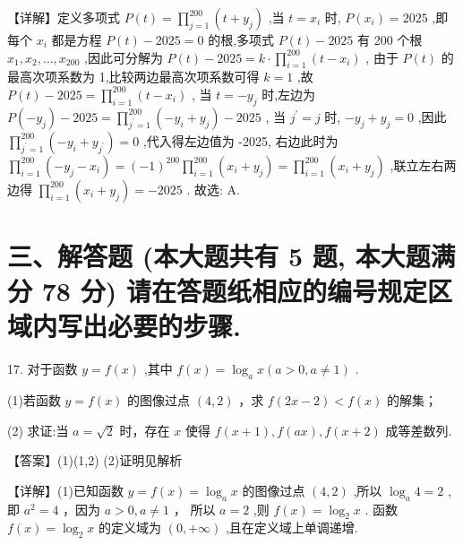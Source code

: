 \documentclass[10pt]{article}
\begin{document}
【详解】定义多项式 \(P\left( t\right)  = \mathop{\prod }\limits_{{j = 1}}^{{200}}\left( {t + {y}_{j}}\right)\) ,当 \(t = {x}_{i}\) 时, \(P\left( {x}_{i}\right)  = {2025}\) ,即每个 \({x}_{i}\) 都是方程 \(P\left( t\right)  - {2025} = 0\) 的根,多项式 \(P\left( t\right)  - {2025}\) 有 200 个根 \({x}_{1},{x}_{2},\ldots ,{x}_{200}\) ,因此可分解为 \(P\left( t\right)  - {2025} = k \cdot  \mathop{\prod }\limits_{{i = 1}}^{{200}}\left( {t - {x}_{i}}\right)\) , 由于 \(P\left( t\right)\) 的最高次项系数为 1,比较两边最高次项系数可得 \(k = 1\) ,故 \(P\left( t\right)  - {2025} = \mathop{\prod }\limits_{{i = 1}}^{{200}}\left( {t - {x}_{i}}\right)\) , 当 \(t =  - {y}_{j}\) 时,左边为 \(P\left( {-{y}_{j}}\right)  - {2025} = \mathop{\prod }\limits_{{{j}^{\prime } = 1}}^{{200}}\left( {-{y}_{i} + {y}_{j}}\right)  - {2025}\) , 当 \({j}^{\prime } = j\) 时, \(- {y}_{j} + {y}_{j} = 0\) ,因此 \(\mathop{\prod }\limits_{{{j}^{\prime } = 1}}^{{200}}\left( {-{y}_{i} + {y}_{{j}^{\prime }}}\right)  = 0\) ,代入得左边值为 -2025, 右边此时为 \(\mathop{\prod }\limits_{{i = 1}}^{{200}}\left( {-{y}_{j} - {x}_{i}}\right)  = {\left( -1\right) }^{200}\mathop{\prod }\limits_{{i = 1}}^{{200}}\left( {{x}_{i} + {y}_{j}}\right)  = \mathop{\prod }\limits_{{i = 1}}^{{200}}\left( {{x}_{i} + {y}_{j}}\right)\) ,联立左右两边得 \(\mathop{\prod }\limits_{{i = 1}}^{{200}}\left( {{x}_{i} + {y}_{j}}\right)  =  - {2025}\) . 故选: A.

\section*{三、解答题 (本大题共有 5 题, 本大题满分 78 分) 请在答题纸相应的编号规定区域内写出必要的步骤.}

17. 对于函数 \(y = f\left( x\right)\) ,其中 \(f\left( x\right)  = {\log }_{a}x\left( {a > 0,a \neq  1}\right)\) .

(1)若函数 \(y = f\left( x\right)\) 的图像过点 \(\left( {4,2}\right)\) ，求 \(f\left( {{2x} - 2}\right)  < f\left( x\right)\) 的解集；

(2) 求证:当 \(a = \sqrt{2}\) 时，存在 \(x\) 使得 \(f\left( {x + 1}\right) ,f\left( {ax}\right) ,f\left( {x + 2}\right)\) 成等差数列.

【答案】(1)(1,2) (2)证明见解析

【详解】(1)已知函数 \(y = f\left( x\right)  = {\log }_{a}x\) 的图像过点 \(\left( {4,2}\right)\) ,所以 \({\log }_{a}4 = 2\) ,即 \({a}^{2} = 4\) ，因为 \(a > 0,a \neq  1\) ， 所以 \(a = 2\) ,则 \(f\left( x\right)  = {\log }_{2}x\) . 函数 \(f\left( x\right)  = {\log }_{2}x\) 的定义域为 \(\left( {0, + \infty }\right)\) ,且在定义域上单调递增.
\end{document}

